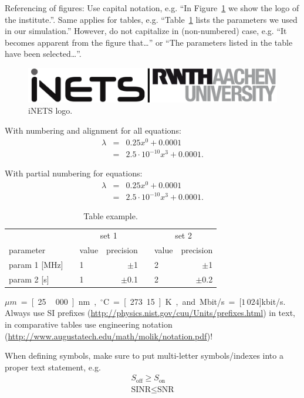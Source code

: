 Referencing of figures: Use capital notation, e.g. ``In Figure~\ref{fig:inets-logo} we show the logo of the institute.''. Same applies for tables, e.g. ``Table~\ref{tab:example} lists the parameters we used in our simulation.'' However, do not capitalize in (non-numbered) case, e.g. ``It becomes apparent from the figure that\dots'' or ``The parameters listed in the table have been selected\dots''.
\begin{figure}\begin{center}
  \includegraphics[width=\textwidth]{pictures/inets_new} %
  \caption{iNETS logo.}\label{fig:inets-logo}
\end{center}\end{figure}

With numbering and alignment for all equations:
\begin{eqnarray}
\lambda&=&0.25 x^0 + 0.0001\\
       &=&2.5\cdot10^{-10} x^3 + 0.0001.
\end{eqnarray}


With partial numbering for equations:
\begin{eqnarray}
\lambda&=&0.25 x^0 + 0.0001 \nonumber \\
       &=&2.5\cdot10^{-10} x^3 + 0.0001.
\end{eqnarray}

\begin{table}
\centering
 \begin{center}
\begin{tabular}{p{2.8cm}p{0.2cm}p{1cm}rp{0.2cm}p{1cm}r}
\toprule
&&\multicolumn{2}{c}{set 1}&&\multicolumn{2}{c}{set 2}\\
\cmidrule{3-4}\cmidrule{6-7}
parameter &&value&precision&&value&precision\\
\midrule
param 1 [MHz]&& 1 & $\pm$1 && 2 & $\pm$1 \\
param 2 [s]&& 1 & $\pm$0.1 && 2 & $\pm$0.2 \\
\bottomrule
 \end{tabular}\caption{Table example.} \label{tab:example}
 \end{center}

\end{table}

\unit[25]{$\mu m$} = \unit[25\,000]{nm},
\unit[0]{$^\circ \text{C}$} = \unit[273.15]{K}, and
\unit[1]{Mbit/s} = \unit[$1\,024$]{kbit/s}. Always use SI prefixes (\url{http://physics.nist.gov/cuu/Units/prefixes.html}) in text, in comparative tables use engineering notation (\url{http://www.augustatech.edu/math/molik/notation.pdf})!

 When defining symbols, make sure to put multi-letter symbols/indexes into a proper text statement, e.g.
 \begin{eqnarray}
S_\text{off} \ge S_\text{on} \\
 \text{SINR} \le \text{SNR} 
 \end{eqnarray} 